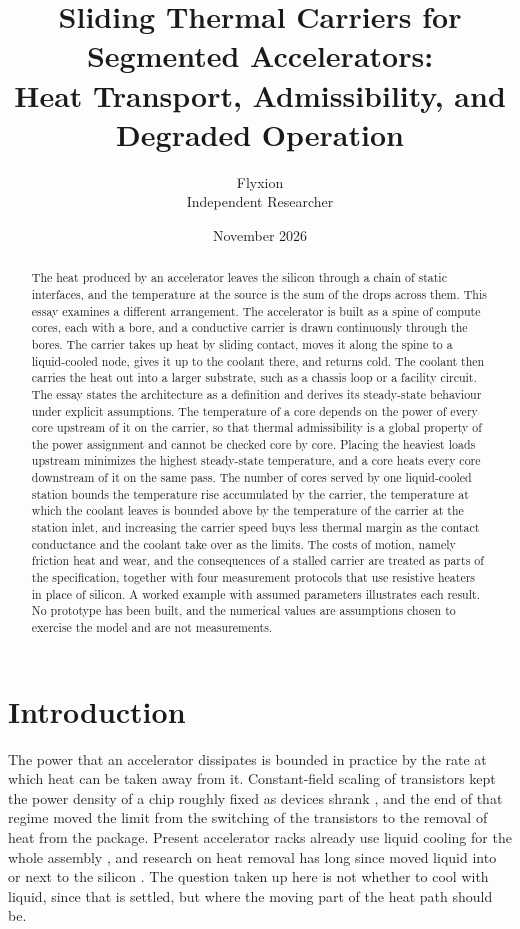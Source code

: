 \documentclass[11pt]{article}
\title{Sliding Thermal Carriers for Segmented Accelerators:\\
Heat Transport, Admissibility, and Degraded Operation}
\author{Flyxion\\Independent Researcher}
\date{November 2026}
\theoremstyle{definition}
\theoremstyle{plain}
\theoremstyle{remark}
\begin{document}
\maketitle

\begin{abstract}
\noindent
The heat produced by an accelerator leaves the silicon through a chain of static interfaces, and the temperature at the source is the sum of the drops across them. This essay examines a different arrangement. The accelerator is built as a spine of compute cores, each with a bore, and a conductive carrier is drawn continuously through the bores. The carrier takes up heat by sliding contact, moves it along the spine to a liquid-cooled node, gives it up to the coolant there, and returns cold. The coolant then carries the heat out into a larger substrate, such as a chassis loop or a facility circuit. The essay states the architecture as a definition and derives its steady-state behaviour under explicit assumptions. The temperature of a core depends on the power of every core upstream of it on the carrier, so that thermal admissibility is a global property of the power assignment and cannot be checked core by core. Placing the heaviest loads upstream minimizes the highest steady-state temperature, and a core heats every core downstream of it on the same pass. The number of cores served by one liquid-cooled station bounds the temperature rise accumulated by the carrier, the temperature at which the coolant leaves is bounded above by the temperature of the carrier at the station inlet, and increasing the carrier speed buys less thermal margin as the contact conductance and the coolant take over as the limits. The costs of motion, namely friction heat and wear, and the consequences of a stalled carrier are treated as parts of the specification, together with four measurement protocols that use resistive heaters in place of silicon. A worked example with assumed parameters illustrates each result. No prototype has been built, and the numerical values are assumptions chosen to exercise the model and are not measurements.
\end{abstract}

\section{Introduction}

The power that an accelerator dissipates is bounded in practice by the rate at which heat can be taken away from it. Constant-field scaling of transistors kept the power density of a chip roughly fixed as devices shrank \cite{dennard}, and the end of that regime moved the limit from the switching of the transistors to the removal of heat from the package. Present accelerator racks already use liquid cooling for the whole assembly \cite{nvidia-gb300}, and research on heat removal has long since moved liquid into or next to the silicon \cite{tuckerman,brunschwiler}. The question taken up here is not whether to cool with liquid, since that is settled, but where the moving part of the heat path should be.
\end{document}
